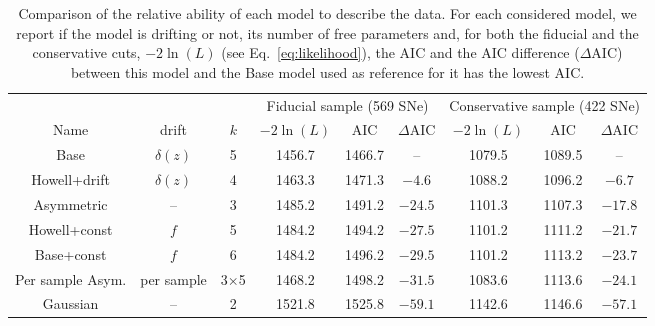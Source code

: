 \documentclass[referee]{aa}
\begin{document}
\begin{table}
    \centering
    \caption{Comparison of the relative ability of each model to describe the
        data. For each considered model, we report if the model is drifting or
        not, its number of free parameters and, for both the fiducial and the
        conservative cuts, $-2\ln(L)$ (see Eq.~\ref{eq:likelihood}), the AIC and
        the AIC difference ($\Delta$AIC) between this model and the Base model
        used as reference for it has the lowest AIC.}
    \label{tab:comp}
    \begin{tabular}{ccc|ccc|ccc}
        \hline\hline
        & & & \multicolumn{3}{c}{Fiducial sample (569 SNe)}
            & \multicolumn{3}{|c}{Conservative sample (422 SNe)} \\
        Name & drift & $k$ &
        $-2\ln(L)$ & AIC & $\Delta$AIC & $-2\ln(L)$ & AIC & $\Delta$AIC\\
        \hline

        Base & $\delta(z)$ & 5
        & 1456.7 & 1466.7 & -- 
        & 1079.5 & 1089.5 & -- \\

        Howell+drift & $\delta(z)$ & 4
        & 1463.3 & 1471.3 & $-4.6$
        & 1088.2 & 1096.2 & $-6.7$ 
        \\

        Asymmetric & -- & 3
        & 1485.2 & 1491.2 & $-24.5$
        & 1101.3 & 1107.3 & $-17.8$ 
        \\

        Howell+const & $f$ & 5
        & 1484.2 & 1494.2 & $-27.5$
        & 1101.2 & 1111.2 & $-21.7$ 
        \\

        Base+const & $f$ & 6
        & 1484.2 & 1496.2 & $-29.5$
        & 1101.2 & 1113.2 & $-23.7$ 
        \\

        Per sample Asym. & per sample & 3$\times$5
        & 1468.2 & 1498.2 & $-31.5$
        & 1083.6 & 1113.6 & $-24.1$ 
        \\

        Gaussian & -- & 2
        & 1521.8 & 1525.8 & $-59.1$
        & 1142.6 & 1146.6 & $-57.1$ 
        \\
        \hline
    \end{tabular}
\end{table}
\end{document}
